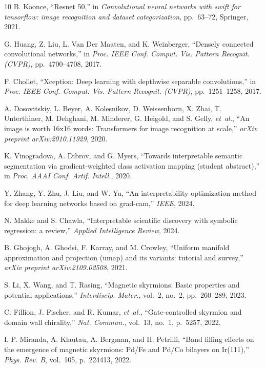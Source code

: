 \documentclass[final,5p,times,twocolumn]{elsarticle}
\begin{document}
\begin{thebibliography}{10}
B. Koonce, ``Resnet 50,'' in {\em Convolutional neural networks with swift for tensorflow: image recognition and dataset categorization}, pp.~63--72, Springer, 2021.

G. Huang, Z. Liu, L. Van Der Maaten, and K. Weinberger, ``Densely connected convolutional networks,'' in {\em Proc. IEEE Conf. Comput. Vis. Pattern Recognit. (CVPR)}, pp.~4700--4708, 2017.

F. Chollet, ``Xception: Deep learning with depthwise separable convolutions,'' in {\em Proc. IEEE Conf. Comput. Vis. Pattern Recognit. (CVPR)}, pp.~1251--1258, 2017.

A. Dosovitskiy, L. Beyer, A. Kolesnikov, D. Weissenborn, X. Zhai, T. Unterthiner, M. Dehghani, M. Minderer, G. Heigold, and S. Gelly, {\em et~al.}, ``An image is worth 16x16 words: Transformers for image recognition at scale,'' {\em arXiv preprint arXiv:2010.11929}, 2020.

K. Vinogradova, A. Dibrov, and G. Myers, ``Towards interpretable semantic segmentation via gradient-weighted class activation mapping (student abstract),'' in {\em Proc. AAAI Conf. Artif. Intell.}, 2020.

Y. Zhang, Y. Zhu, J. Liu, and W. Yu, ``An interpretability optimization method for deep learning networks based on grad-cam,'' {\em IEEE}, 2024.

N. Makke and S. Chawla, ``Interpretable scientific discovery with symbolic regression: a review,'' {\em Applied Intelligence Review}, 2024.

B. Ghojogh, A. Ghodsi, F. Karray, and M. Crowley, ``Uniform manifold approximation and projection (umap) and its variants: tutorial and survey,'' {\em arXiv preprint arXiv:2109.02508}, 2021.

S. Li, X. Wang, and T. Rasing, ``Magnetic skyrmions: Basic properties and potential applications,'' {\em Interdiscip. Mater.}, vol.~2, no.~2, pp.~260--289, 2023.

C. Fillion, J. Fischer, and R. Kumar, {\em et~al.}, ``Gate-controlled skyrmion and domain wall chirality,'' {\em Nat. Commun.}, vol.~13, no.~1, p.~5257, 2022.

I. P. Miranda, A. Klautau, A. Bergman, and H. Petrilli, ``Band filling effects on the emergence of magnetic skyrmions: Pd/Fe and Pd/Co bilayers on Ir(111),'' {\em Phys. Rev. B}, vol.~105, p.~224413, 2022.


\end{thebibliography}
\end{document}
